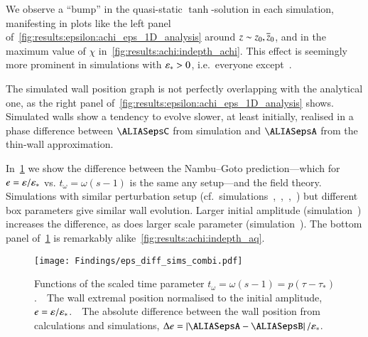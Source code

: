 We observe a ``bump'' in the quasi-static $\tanh$-solution in each simulation, manifesting in plots like the left panel of~\cref{fig:results:epsilon:achi_eps_1D_analysis} around $z\sim z_0,\overline{z}_0$, and in the maximum value of $\chi$ in~\cref{fig:results:achi:indepth_achi}. This effect is seemingly more prominent in simulations with $\varepsilon_\ast >0$, i.e.~everyone except~. 

The simulated wall position graph is not perfectly overlapping with the analytical one, as the right panel of~\cref{fig:results:epsilon:achi_eps_1D_analysis} shows. Simulated walls show a tendency to evolve slower, at least initially, realised in a phase difference between $\epsC$ from simulation and $\epsA$ from the thin-wall approximation.%


In~\cref{fig:results:epsilon:eps_diff_sims_combi} we show the difference between the Nambu--Goto prediction---which for $e=\varepsilon/\varepsilon_\ast$ vs. $t_\omega=\omega (s-1)$ is the same any setup---and the field theory. Simulations with similar perturbation setup (cf.~simulations~,~,~,~) but different box parameters give similar wall evolution. 
Larger initial amplitude (simulation~) increases the difference, as does larger scale parameter (simulation~). %
The bottom panel of~\cref{fig:results:epsilon:eps_diff_sims_combi} is remarkably alike~\cref{fig:results:achi:indepth_aq}.
\begin{figure}[h]
    \centering
    \texttt{[image: Findings/eps\_diff\_sims\_combi.pdf]}
    \caption{Functions of the scaled time parameter $t_\omega = \omega (s-1) = p(\tau-\tau_\ast)$.~~The wall extremal position normalised to the initial amplitude, $e=\varepsilon/\varepsilon_\ast$.~~The absolute difference between the wall position from calculations and simulations, $\Delta e = \abs*{\epsA-\epsB}/\epsast$.}
    \label{fig:results:epsilon:eps_diff_sims_combi}
\end{figure}


